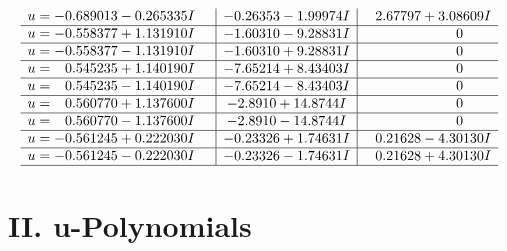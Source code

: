 \documentclass[1p]{elsarticle_modified}
\theoremstyle{definition}
\begin{document}
$$\begin{array}{c|c|c}
\begin{aligned}
u &= -0.689013 - 0.265335 I\end{aligned}
 & -0.26353 - 1.99974 I & \phantom{-}2.67797 + 3.08609 I \\ \hline\begin{aligned}
u &= -0.558377 + 1.131910 I\end{aligned}
 & -1.60310 - 9.28831 I & \phantom{-0.000000 } 0 \\ \hline\begin{aligned}
u &= -0.558377 - 1.131910 I\end{aligned}
 & -1.60310 + 9.28831 I & \phantom{-0.000000 } 0 \\ \hline\begin{aligned}
u &= \phantom{-}0.545235 + 1.140190 I\end{aligned}
 & -7.65214 + 8.43403 I & \phantom{-0.000000 } 0 \\ \hline\begin{aligned}
u &= \phantom{-}0.545235 - 1.140190 I\end{aligned}
 & -7.65214 - 8.43403 I & \phantom{-0.000000 } 0 \\ \hline\begin{aligned}
u &= \phantom{-}0.560770 + 1.137600 I\end{aligned}
 & -2.8910 + 14.8744 I & \phantom{-0.000000 } 0 \\ \hline\begin{aligned}
u &= \phantom{-}0.560770 - 1.137600 I\end{aligned}
 & -2.8910 - 14.8744 I & \phantom{-0.000000 } 0 \\ \hline\begin{aligned}
u &= -0.561245 + 0.222030 I\end{aligned}
 & -0.23326 + 1.74631 I & \phantom{-}0.21628 - 4.30130 I \\ \hline\begin{aligned}
u &= -0.561245 - 0.222030 I\end{aligned}
 & -0.23326 - 1.74631 I & \phantom{-}0.21628 + 4.30130 I\\
 \hline 
 \end{array}$$\newpage
\newpage\renewcommand{\arraystretch}{1}
\centering \section*{ II. u-Polynomials}
\end{document}
